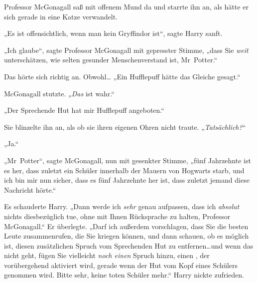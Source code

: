 Professor McGonagall saß mit offenem Mund da und starrte ihn an, als hätte er sich gerade in eine Katze verwandelt.

„Es ist offensichtlich, wenn man kein Gryffindor ist“, sagte Harry sanft.

„Ich glaube“, sagte Professor McGonagall mit gepresster Stimme, „dass Sie \emph{weit} unterschätzen, wie selten gesunder Menschenverstand ist, Mr~Potter.“





Das hörte sich richtig an. Obwohl… „Ein Hufflepuff hätte das Gleiche gesagt.“

McGonagall stutzte. \emph{„Das} ist wahr.“

„Der Sprechende Hut hat mir Hufflepuff angeboten.“

Sie blinzelte ihn an, als ob sie ihren eigenen Ohren nicht traute. „\emph{Tatsächlich?}“

„Ja.“

„Mr~Potter“, sagte McGonagall, nun mit gesenkter Stimme, „fünf Jahrzehnte ist es her, dass zuletzt ein Schüler innerhalb der Mauern von Hogwarts starb, und ich bin mir nun sicher, dass es fünf Jahrzehnte her ist, dass zuletzt jemand diese Nachricht hörte.“

Es schauderte Harry. „Dann werde ich \emph{sehr} genau aufpassen, dass ich \emph{absolut} nichts diesbezüglich tue, ohne mit Ihnen Rücksprache zu halten, Professor McGonagall.“ Er überlegte. „Darf ich außerdem vorschlagen, dass Sie die besten Leute zusammenrufen, die Sie kriegen können, und dann schauen, ob es möglich ist, diesen zusätzlichen Spruch vom Sprechenden Hut zu entfernen…und wenn das nicht geht, fügen Sie vielleicht \emph{noch einen} Spruch hinzu, einen , der vorübergehend aktiviert wird, gerade wenn der Hut vom Kopf eines Schülers genommen wird. Bitte sehr, keine toten Schüler mehr.“ Harry nickte zufrieden.

